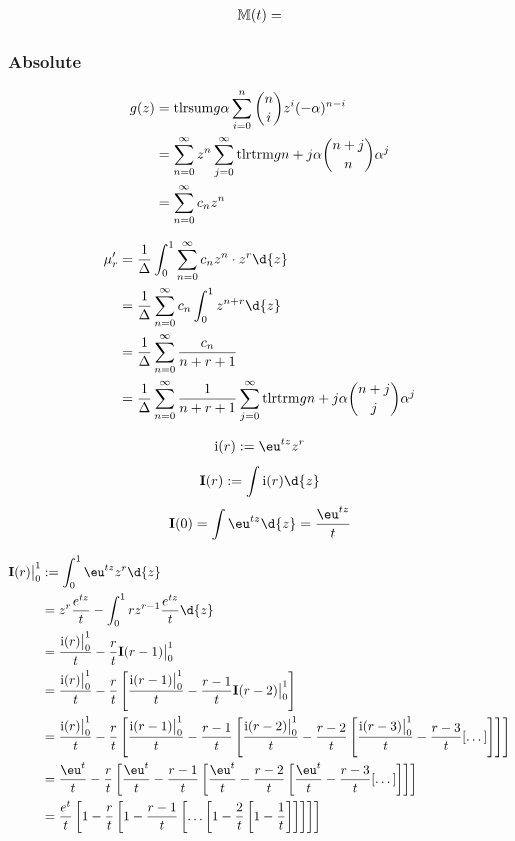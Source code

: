 \begin{align*}
    \mathbb M(t) = 
\end{align*}

\subsubsection{Absolute}



\begin{align*}
    g(z)
    &= \mathrm{tlrsum}{g}{\alpha} \sum_{i=0}^n {n \choose i} z^i (-\alpha)^{n-i} \\
    &= \sum_{n=0}^{\infty} z^n \sum_{j=0}^{\infty} \mathrm{tlrtrm}{g}{n+j}{\alpha} {n+j \choose n} \alpha^j \\
    &= \sum_{n=0}^{\infty} c_n z^n
\end{align*}

\begin{align*}
    \mu'_r
    &= \frac{1}{\Delta} \int_0^1 \sum_{n=0}^\infty c_n z^n \cdot z^r  \d{z} \\
    &= \frac{1}{\Delta} \sum_{n=0}^\infty c_n \int_0^1 z^{n+r}  \d{z} \\
    &= \frac{1}{\Delta} \sum_{n=0}^\infty \frac{c_n}{n+r+1} \\
    &= \frac{1}{\Delta} \sum_{n=0}^\infty \frac{1}{n+r+1} \sum_{j=0}^\infty \tlrtrm{g}{n+j}{\alpha} {n+j \choose j} \alpha^j
\end{align*}

\[ \i(r) := \eu^{tz} z^r \]
\[ \I(r) := \int \i(r) \d{z} \]
\[ \I(0) = \int \eu^{tz} \d{z} = \frac{\eu^{tz}}{t} \]

\begin{align*}
    \I(r) \big|_0^1
    &:= \int_{0}^{1} \eu^{tz} z^r \d{z} \\
    &= z^r \frac{e^{tz}}{t} - \int_0^1 r z^{r-1} \frac{e^{tz}}{t} \d{z} \\
    &= \frac{\i(r) \big|_0^1}{t}-\frac{r}{t} \I(r-1) \big|_0^1 \\
    &= \frac{\i(r) \big|_0^1}{t}-\frac{r}{t} \left[ \frac{\i(r-1) \big|_0^1}{t}-\frac{r-1}{t} \I(r-2) \big|_0^1 \right] \\
    &= \frac{\i(r) \big|_0^1}{t}-\frac{r}{t} \left[ \frac{\i(r-1) \big|_0^1}{t}-\frac{r-1}{t}  \left[ \frac{\i(r-2) \big|_0^1}{t}-\frac{r-2}{t} \left[ \frac{\i(r-3) \big|_0^1}{t}-\frac{r-3}{t} [\dots] \right] \right] \right] \\
    &= \frac{\eu^{t}}{t}-\frac{r}{t} \left[ \frac{\eu^{t}}{t}-\frac{r-1}{t}  \left[ \frac{\eu^{t}}{t}-\frac{r-2}{t} \left[ \frac{\eu^{t}}{t}-\frac{r-3}{t} [\dots] \right] \right] \right] \\
    &= \frac{e^{t}}{t} \left[ 1 - \frac{r}{t} \left[ 1 - \frac{r-1}{t} \left[ \dots \left[ 1 - \frac{2}{t} \left[ 1 - \frac{1}{t} \right] \right] \right] \right] \right]
\end{align*}

